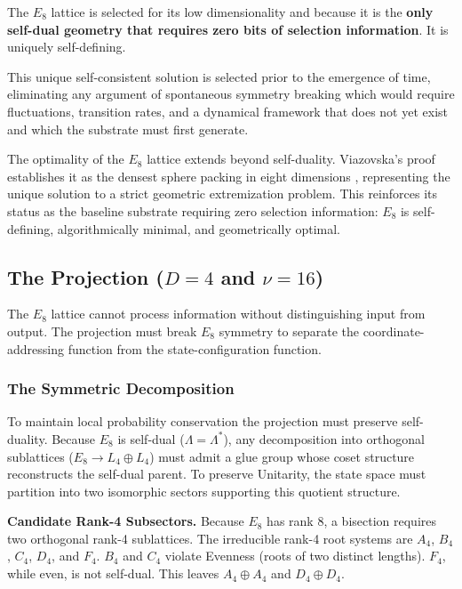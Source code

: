 The $E_8$ lattice is selected for its low dimensionality and because it is the \textbf{only self-dual geometry that requires zero bits of selection information}. It is uniquely self-defining.

This unique self-consistent solution is selected prior to the emergence of time, eliminating any argument of spontaneous symmetry breaking which would require fluctuations, transition rates, and a dynamical framework that does not yet exist and which the substrate must first generate.

The optimality of the $E_8$ lattice extends beyond self-duality. Viazovska's proof establishes it as the densest sphere packing in eight dimensions \cite{viazovska_sphere_2017}, representing the unique solution to a strict geometric extremization problem. This reinforces its status as the baseline substrate requiring zero selection information: $E_8$ is self-defining, algorithmically minimal, and geometrically optimal.

\subsection{The Projection (\texorpdfstring{$D=4$}{D=4} and \texorpdfstring{$\nu=16$}{nu=16})}
\label{sec:projection}
The $E_8$ lattice cannot process information without distinguishing input from output. The projection must break $E_8$ symmetry to separate the coordinate-addressing function from the state-configuration function.

\subsubsection{The Symmetric Decomposition}
\label{sec:symmetric_decomposition}

To maintain local probability conservation the projection must preserve self-duality. Because $E_8$ is self-dual ($\Lambda = \Lambda^*$), any decomposition into orthogonal sublattices ($E_8 \to L_4 \oplus L_4$) must admit a glue group whose coset structure reconstructs the self-dual parent. To preserve Unitarity, the state space must partition into two isomorphic sectors supporting this quotient structure.

\textbf{Candidate Rank-4 Subsectors.} 
Because $E_8$ has rank 8, a bisection requires two orthogonal rank-4 sublattices. The irreducible rank-4 root systems are $A_4$, $B_4$, $C_4$, $D_4$, and $F_4$. $B_4$ and $C_4$ violate Evenness (roots of two distinct lengths). $F_4$, while even, is not self-dual. This leaves $A_4 \oplus A_4$ and $D_4 \oplus D_4$.


